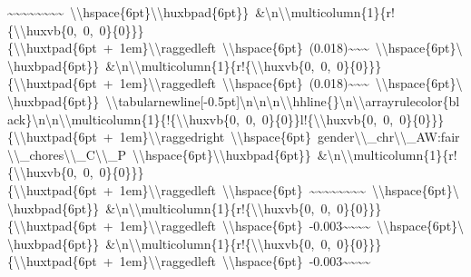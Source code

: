 \documentclass[
  english,
  man]{apa6}
\begin{document}
\textasciitilde{}\textasciitilde{}\textasciitilde{}\textasciitilde{}\textasciitilde{}\textasciitilde{}\textasciitilde{}\textasciitilde{}\ \textbackslash{}\textbackslash{}hspace\{6pt\}\textbackslash{}\textbackslash{}huxbpad\{6pt\}\}\ \&\textbackslash{}n\textbackslash{}\textbackslash{}multicolumn\{1\}\{r!\{\textbackslash{}\textbackslash{}huxvb\{0,\ 0,\ 0\}\{0\}\}\}\{\textbackslash{}\textbackslash{}huxtpad\{6pt\ +\ 1em\}\textbackslash{}\textbackslash{}raggedleft\ \textbackslash{}\textbackslash{}hspace\{6pt\}\ (0.018)\textasciitilde{}\textasciitilde{}\textasciitilde{}\ \textbackslash{}\textbackslash{}hspace\{6pt\}\textbackslash{}\textbackslash{}huxbpad\{6pt\}\}\ \&\textbackslash{}n\textbackslash{}\textbackslash{}multicolumn\{1\}\{r!\{\textbackslash{}\textbackslash{}huxvb\{0,\ 0,\ 0\}\{0\}\}\}\{\textbackslash{}\textbackslash{}huxtpad\{6pt\ +\ 1em\}\textbackslash{}\textbackslash{}raggedleft\ \textbackslash{}\textbackslash{}hspace\{6pt\}\ (0.018)\textasciitilde{}\textasciitilde{}\textasciitilde{}\ \textbackslash{}\textbackslash{}hspace\{6pt\}\textbackslash{}\textbackslash{}huxbpad\{6pt\}\}\ \textbackslash{}\textbackslash{}tabularnewline{[}-0.5pt{]}\textbackslash{}n\textbackslash{}n\textbackslash{}n\textbackslash{}\textbackslash{}hhline\{\}\textbackslash{}n\textbackslash{}\textbackslash{}arrayrulecolor\{black\}\textbackslash{}n\textbackslash{}n\textbackslash{}\textbackslash{}multicolumn\{1\}\{!\{\textbackslash{}\textbackslash{}huxvb\{0,\ 0,\ 0\}\{0\}\}l!\{\textbackslash{}\textbackslash{}huxvb\{0,\ 0,\ 0\}\{0\}\}\}\{\textbackslash{}\textbackslash{}huxtpad\{6pt\ +\ 1em\}\textbackslash{}\textbackslash{}raggedright\ \textbackslash{}\textbackslash{}hspace\{6pt\}\ gender\textbackslash{}\textbackslash{}\_chr\textbackslash{}\textbackslash{}\_AW:fair\textbackslash{}\textbackslash{}\_chores\textbackslash{}\textbackslash{}\_C\textbackslash{}\textbackslash{}\_P\ \textbackslash{}\textbackslash{}hspace\{6pt\}\textbackslash{}\textbackslash{}huxbpad\{6pt\}\}\ \&\textbackslash{}n\textbackslash{}\textbackslash{}multicolumn\{1\}\{r!\{\textbackslash{}\textbackslash{}huxvb\{0,\ 0,\ 0\}\{0\}\}\}\{\textbackslash{}\textbackslash{}huxtpad\{6pt\ +\ 1em\}\textbackslash{}\textbackslash{}raggedleft\ \textbackslash{}\textbackslash{}hspace\{6pt\}\ \textasciitilde{}\textasciitilde{}\textasciitilde{}\textasciitilde{}\textasciitilde{}\textasciitilde{}\textasciitilde{}\textasciitilde{}\ \textbackslash{}\textbackslash{}hspace\{6pt\}\textbackslash{}\textbackslash{}huxbpad\{6pt\}\}\ \&\textbackslash{}n\textbackslash{}\textbackslash{}multicolumn\{1\}\{r!\{\textbackslash{}\textbackslash{}huxvb\{0,\ 0,\ 0\}\{0\}\}\}\{\textbackslash{}\textbackslash{}huxtpad\{6pt\ +\ 1em\}\textbackslash{}\textbackslash{}raggedleft\ \textbackslash{}\textbackslash{}hspace\{6pt\}\ -0.003\textasciitilde{}\textasciitilde{}\textasciitilde{}\textasciitilde{}\ \textbackslash{}\textbackslash{}hspace\{6pt\}\textbackslash{}\textbackslash{}huxbpad\{6pt\}\}\ \&\textbackslash{}n\textbackslash{}\textbackslash{}multicolumn\{1\}\{r!\{\textbackslash{}\textbackslash{}huxvb\{0,\ 0,\ 0\}\{0\}\}\}\{\textbackslash{}\textbackslash{}huxtpad\{6pt\ +\ 1em\}\textbackslash{}\textbackslash{}raggedleft\ \textbackslash{}\textbackslash{}hspace\{6pt\}\ -0.003\textasciitilde{}\textasciitilde{}\textasciitilde{}\textasciitilde{}\ 
\end{document}
